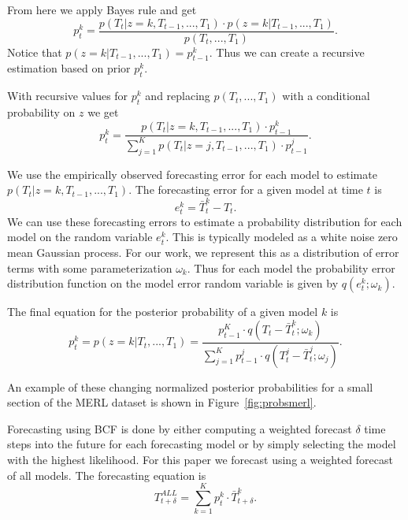 From here we apply Bayes rule and get
\begin{equation}
p_{t}^{k} = \frac{p(T_{t} | z = k, T_{t - 1}, ..., T_{1}) \cdot p(z = k | T_{t - 1}, ..., T_{1})} {p(T_{t}, ..., T_{1})}.
\end{equation}
\noindent
Notice that $p(z = k | T_{t - 1}, ..., T_{1}) = p_{t - 1}^{k}$.  Thus we can create a recursive estimation based on prior $p_{t}^{k}$.

With recursive values for $p_{t}^{k}$ and replacing $p(T_{t}, ..., T_{1})$ with a conditional probability on $z$ we get
\begin{equation}
p_{t}^{k} = \frac{p(T_{t} | z = k, T_{t - 1}, ..., T_{1}) \cdot p_{t - 1}^{k}} {\sum_{j = 1}^{K}p(T_{t} | z = j, T_{t - 1}, ..., T_{1}) \cdot p_{t - 1}^{j}}.
\end{equation}

We use the empirically observed forecasting error for each model to estimate $p(T_{t}|z = k, T_{t - 1}, ..., T_{1})$.  The forecasting error for a given model at time $t$ is 
\begin{equation}
e_{t}^{k} = \bar{T}_{t}^{k} - T_{t}.
\end{equation}
\noindent
We can use these forecasting errors to estimate a probability distribution for each model on the random variable $e_{t}^{k}$.  This is typically modeled as a white noise zero mean Gaussian process.  For our work, we represent this as a distribution of error terms with some parameterization $\omega_{k}$.  Thus for each model the probability error distribution function on the model error random variable is given by $q(e_{t}^{k};\omega_{k})$.

The final equation for the posterior probability of a given model $k$ is
\begin{equation}
\label{eq:model_prob}
p_{t}^{k} = p(z = k|T_{t}, ..., T_{1}) = \frac{p_{t - 1}^{K} \cdot q(T_{t} - \bar{T}_{t}^{k}; \omega_{k})}{\sum_{j=1}^{K}p_{t - 1}^{j} \cdot q(T_{t}^{j} - \bar{T}_{t}^{j}; \omega_{j})}.
\end{equation}

An example of these changing normalized posterior probabilities for a small section of the MERL dataset is shown in Figure~\ref{fig:probsmerl}.

Forecasting using BCF is done by either computing a weighted forecast $\delta$ time steps into the future for each forecasting model or by simply selecting the model with the highest likelihood.  For this paper we forecast using a weighted forecast of all models.  The forecasting equation is
\begin{equation}
T_{t + \delta}^{ALL} = \sum_{k=1}^{K}p_{t}^{k} \cdot \bar{T}_{t + \delta}^{k}.
\end{equation}


